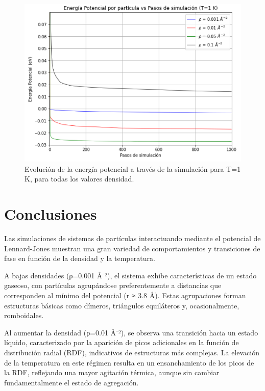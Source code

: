 \begin{figure}[H]
	\centering
	\begin{minipage}[b]{0.65\textwidth}
		\centering
		\includegraphics[width=1\textwidth]{grafico_3x22_termalizacion.png}
		\caption{\footnotesize Evolución de la energía potencial a través de la simulación para T=1 K, para todas los valores densidad.}
		\label{fig:termal}
	\end{minipage}%
\end{figure}


\section{Conclusiones}

Las simulaciones de sistemas de partículas interactuando mediante el potencial de Lennard-Jones muestran una gran variedad de comportamientos y transiciones de fase en función de la densidad y la temperatura. 

\vspace{\baselineskip}

A bajas densidades (ρ=0.001 Å⁻²), el sistema exhibe características de un estado gaseoso, con partículas agrupándose preferentemente a distancias que corresponden al mínimo del potencial (r ≈ 3.8 Å). Estas agrupaciones forman estructuras básicas como dímeros, triángulos equiláteros y, ocasionalmente, romboidales.

\vspace{\baselineskip}

Al aumentar la densidad (ρ=0.01 Å⁻²), se observa una transición hacia un estado líquido, caracterizado por la aparición de picos adicionales en la función de distribución radial (RDF), indicativos de estructuras más complejas. La elevación de la temperatura en este régimen resulta en un ensanchamiento de los picos de la RDF, reflejando una mayor agitación térmica, aunque sin cambiar fundamentalmente el estado de agregación.


